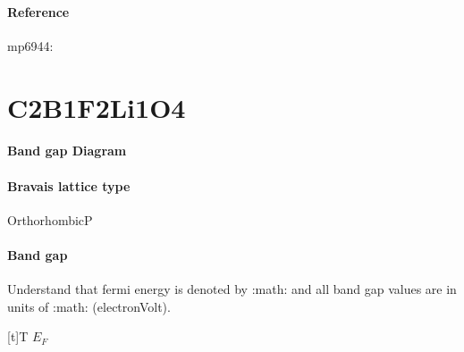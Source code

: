 \documentclass[letterpaper,10pt,english]{sphinxmanual}
\begin{document}
\subsubsection*{Reference}

\sphinxAtStartPar
mp\sphinxhyphen{}6944: 

\sphinxstepscope


\chapter{C2B1F2Li1O4}
\label{\detokenize{C2B1F2Li1O4/C2B1F2Li1O4:c2b1f2li1o4}}\label{\detokenize{C2B1F2Li1O4/C2B1F2Li1O4::doc}}\subsubsection*{Band gap Diagram}

\noindent{}
\subsubsection*{Bravais lattice type}

\sphinxAtStartPar
OrthorhombicP
\subsubsection*{Band gap}

\sphinxAtStartPar
Understand that fermi energy is denoted by :math: and all band gap values are in units of :math: (electron\sphinxhyphen{}Volt).


\begin{savenotes}\sphinxattablestart
\sphinxthistablewithglobalstyle
\centering
\begin{tabulary}{\linewidth}[t]{T}
\sphinxtoprule
\sphinxstyletheadfamily 
\sphinxAtStartPar
\(E_F\)
\\
\sphinxmidrule
\sphinxtableatstartofbodyhook
{}
\\
\sphinxbottomrule
\end{tabulary}
\sphinxtableafterendhook\par
\sphinxattableend\end{savenotes}
\end{document}

